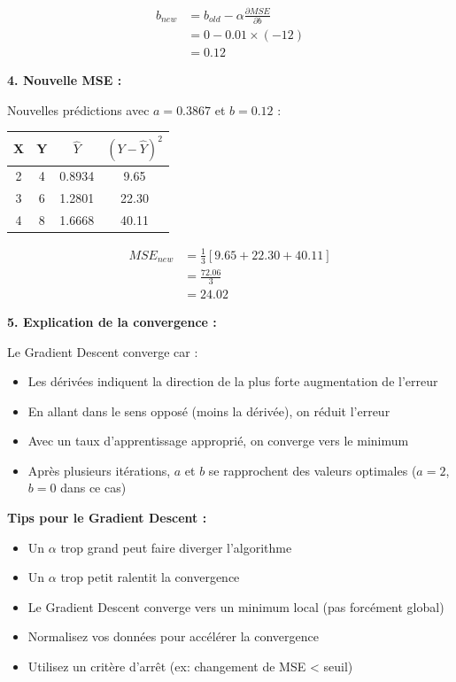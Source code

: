 \documentclass[11pt,a4paper]{article}
\begin{document}
\begin{solutionbox}
\begin{align*}
b_{new} &= b_{old} - \alpha \frac{\partial MSE}{\partial b} \\
        &= 0 - 0.01 \times (-12) \\
        &= 0.12
\end{align*}

\textbf{4. Nouvelle MSE :}

Nouvelles prédictions avec $a = 0.3867$ et $b = 0.12$ :

\begin{center}
\begin{tabular}{|c|c|c|c|}
\hline
\textbf{X} & \textbf{Y} & \textbf{$\hat{Y}$} & \textbf{$(Y - \hat{Y})^2$} \\
\hline
2 & 4 & 0.8934 & 9.65 \\
3 & 6 & 1.2801 & 22.30 \\
4 & 8 & 1.6668 & 40.11 \\
\hline
\end{tabular}
\end{center}

\begin{align*}
MSE_{new} &= \frac{1}{3}[9.65 + 22.30 + 40.11] \\
          &= \frac{72.06}{3} \\
          &= 24.02
\end{align*}

\textbf{5. Explication de la convergence :}

Le Gradient Descent converge car :
\begin{itemize}
    \item Les dérivées indiquent la direction de la plus forte augmentation de l'erreur
    \item En allant dans le sens opposé (moins la dérivée), on réduit l'erreur
    \item Avec un taux d'apprentissage approprié, on converge vers le minimum
    \item Après plusieurs itérations, $a$ et $b$ se rapprochent des valeurs optimales ($a=2$, $b=0$ dans ce cas)
\end{itemize}
\end{solutionbox}

\begin{tipbox}
\textbf{Tips pour le Gradient Descent :}
\begin{itemize}
    \item Un $\alpha$ trop grand peut faire diverger l'algorithme
    \item Un $\alpha$ trop petit ralentit la convergence
    \item Le Gradient Descent converge vers un minimum local (pas forcément global)
    \item Normalisez vos données pour accélérer la convergence
    \item Utilisez un critère d'arrêt (ex: changement de MSE < seuil)
\end{itemize}
\end{tipbox}
\end{document}
